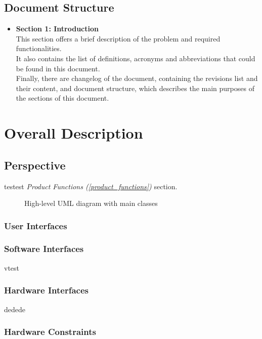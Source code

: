 \subsection{Document Structure}
\begin{itemize}
    \item {\textbf{Section 1: Introduction}\\This section offers a brief description of the problem and required functionalities. \\It also contains the list of definitions, acronyms and abbreviations that could be found in this document. \\Finally, there are changelog of the document, containing the revisions list and their content, and document structure, which describes the main purposes of the sections of this document.}

\end{itemize}
\newpage
\section{Overall Description}
\subsection{Perspective}
testest \textit{Product Functions (\ref{product_functions})} section.

\begin{figure}
    \hspace{-108px}
    \caption{High-level UML diagram with main classes}
    \label{class_diagram}

\end{figure}

\subsubsection{User Interfaces}


\subsubsection{Software Interfaces}
vtest
\subsubsection{Hardware Interfaces}
dedede
\subsubsection{Hardware Constraints}

